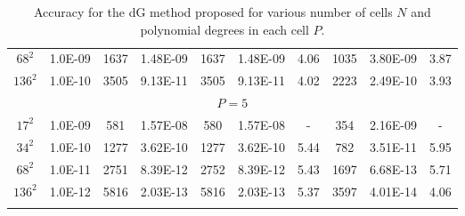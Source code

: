 {\begin{longtable}{cccccccccc}
$68^2$ & 1.0E-09 & 1637 & 1.48E-09 & 1637 & 1.48E-09 & 4.06 & 1035&3.80E-09 & 3.87 \\ 
$136^2$& 1.0E-10 & 3505 & 9.13E-11 & 3505 & 9.13E-11 & 4.02 & 2223&2.49E-10 & 3.93 \\ 
 \multicolumn{10}{c}{ $P=5$ }  \\ 
$17^2$ & 1.0E-09 & 581 & 1.57E-08 & 580 & 1.57E-08 & - & 354&2.16E-09 & - \\ 
$34^2$ & 1.0E-10 & 1277 & 3.62E-10 & 1277 & 3.62E-10 & 5.44 & 782&3.51E-11 & 5.95 \\ 
$68^2$ & 1.0E-11 & 2751 & 8.39E-12 & 2752 & 8.39E-12 & 5.43 & 1697&6.68E-13 & 5.71 \\ 
$136^2$& 1.0E-12 & 5816 & 2.03E-13 & 5816 & 2.03E-13 & 5.37 & 3597&4.01E-14 & 4.06 \\ 
\bottomrule
\caption{Accuracy for the dG method proposed for various number of cells $N$ and polynomial degrees in each cell $P$.}
\label{tab:polarisation}
\end{longtable}
}
